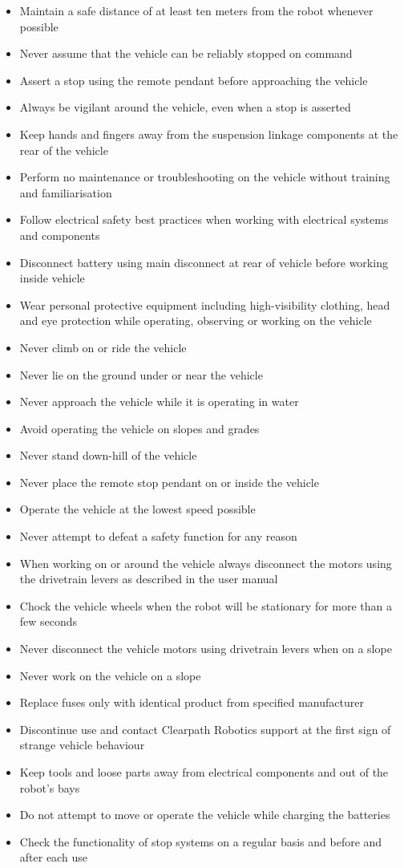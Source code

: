 \documentclass[]{clearpath-latex/clearpath-manual}
\begin{document}
\begin{itemize}[nolistsep]
 \item Maintain a safe distance of at least ten meters from the robot whenever possible
 \item Never assume that the vehicle can be reliably stopped on command
 \item Assert a stop using the remote pendant before approaching the vehicle
 \item Always be vigilant around the vehicle, even when a stop is asserted
 \item Keep hands and fingers away from the suspension linkage components at the rear of the vehicle
 \item Perform no maintenance or troubleshooting on the vehicle without training and familiarisation
 \item Follow electrical safety best practices when working with electrical systems and components
 \item Disconnect battery using main disconnect at rear of vehicle before working inside vehicle
 \item Wear personal protective equipment including high-visibility clothing, head and eye protection while operating, observing or working on the vehicle
 \item Never climb on or ride the vehicle
 \item Never lie on the ground under or near the vehicle
 \item Never approach the vehicle while it is operating in water
 \item Avoid operating the vehicle on slopes and grades
 \item Never stand down-hill of the vehicle
 \item Never place the remote stop pendant on or inside the vehicle
 \item Operate the vehicle at the lowest speed possible
 \item Never attempt to defeat a safety function for any reason
 \item When working on or around the vehicle always disconnect the motors using the drivetrain levers as described in the user manual
 \item Chock the vehicle wheels when the robot will be stationary for more than a few seconds
 \item Never disconnect the vehicle motors using drivetrain levers when on a slope
 \item Never work on the vehicle on a slope
 \item Replace fuses only with identical product from specified manufacturer
 \item Discontinue use and contact Clearpath Robotics support at the first sign of strange vehicle behaviour
 \item Keep tools and loose parts away from electrical components and out of the robot’s bays
 \item Do not attempt to move or operate the vehicle while charging the batteries
 \item Check the functionality of stop systems on a regular basis and before and after each use
\end{itemize}
\end{document}
